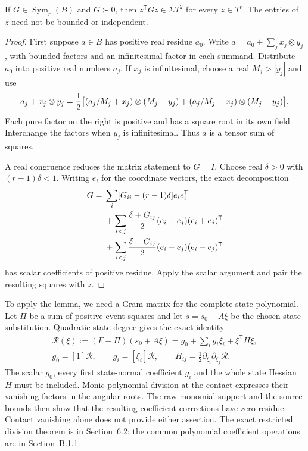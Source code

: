 \begin{lemma}\label{lem:insight-gram}
If $G\in\operatorname{Sym}_r(B)$ and $\overline G\succ0$, then
$z^{\mathsf T}Gz\in\Sigma T^2$ for every $z\in T^r$.
The entries of $z$ need not be bounded or independent.
\end{lemma}
\begin{proof}
First suppose $a\in B$ has positive real residue $a_0$.
Write $a=a_0+\sum_jx_j\otimes y_j$, with bounded factors and
an infinitesimal factor in each summand. Distribute $a_0$ into
positive real numbers $a_j$. If $x_j$ is infinitesimal, choose
a real $M_j>|y_j|$ and use
\[
 a_j+x_j\otimes y_j
 ={1\over2}\bigl[(a_j/M_j+x_j)\otimes(M_j+y_j)
                +(a_j/M_j-x_j)\otimes(M_j-y_j)\bigr].
\]
Each pure factor on the right is positive and has a square root
in its own field. Interchange the factors when $y_j$ is
infinitesimal. Thus $a$ is a tensor sum of squares.

A real congruence reduces the matrix statement to
$\overline G=I$. Choose real $\delta>0$ with $(r-1)\delta<1$.
Writing $e_i$ for the coordinate vectors, the exact decomposition
\[
\begin{aligned}
 G={}&\sum_i[G_{ii}-(r-1)\delta]e_ie_i^{\mathsf T}\\
 &+\sum_{i<j}{\delta+G_{ij}\over2}(e_i+e_j)(e_i+e_j)^{\mathsf T}\\
 &+\sum_{i<j}{\delta-G_{ij}\over2}(e_i-e_j)(e_i-e_j)^{\mathsf T}
\end{aligned}
\]
has scalar coefficients of positive residue. Apply the scalar
argument and pair the resulting squares with $z$.
\end{proof}

To apply the lemma, we need a Gram matrix for the complete state
polynomial. Let $\Pi$ be a sum of positive event squares and let
$s=s_0+A\xi$ be the chosen state substitution. Quadratic state
degree gives the exact identity
\begin{equation}\label{eq:insight-whole-state}
 \begin{gathered}
 \mathcal R(\xi):=(F-\Pi)(s_0+A\xi)
        =g_0+\sum_i g_i\xi_i+\xi^{\mathsf T}H\xi,\\
 g_0=[1]\mathcal R,\qquad g_i=[\xi_i]\mathcal R,\qquad
 H_{ij}=\tfrac12\partial_{\xi_i}\partial_{\xi_j}\mathcal R.
 \end{gathered}
\end{equation}
The scalar $g_0$, every first state-normal coefficient $g_i$ and
the whole state Hessian $H$ must be included. Monic polynomial
division at the contact expresses their vanishing factors in the
angular roots. The raw monomial support and the source bounds
then show that the resulting coefficient corrections have zero
residue. Contact vanishing alone does not provide either assertion.
The exact restricted division theorem is in
Section~6.2; the common polynomial
coefficient operations are in Section~B.1.1.

